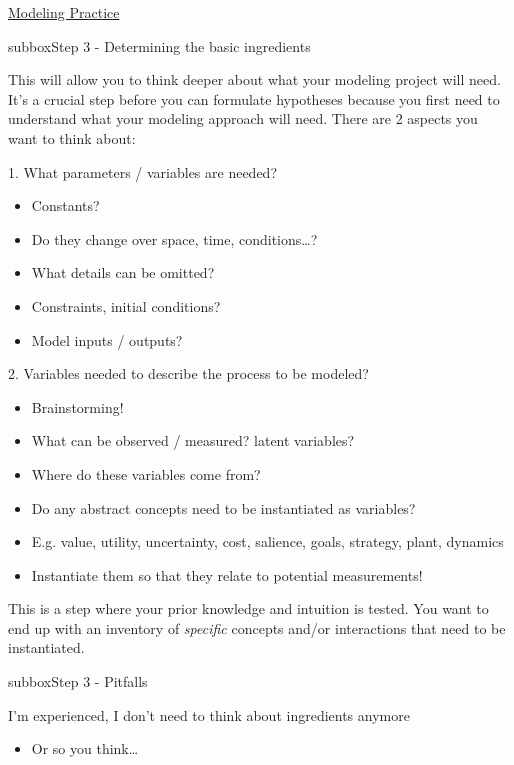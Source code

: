 \begin{textbox}{\href{https://compneuro.neuromatch.io/projects/modelingsteps/ModelingSteps_5through10.html}{Modeling Practice } }

\begin{subbox}{subbox}{Step 3 - Determining the basic ingredients }
\scriptsize

This will allow you to think deeper about what your modeling project will need. It's a crucial step before you can formulate hypotheses because you first need to understand what your modeling approach will need. There are 2 aspects you want to think about:



1.   What parameters / variables are needed? 
\begin{itemize}
    \item 
     Constants?
      \item Do they change over space, time, conditions…?
     \item What details can be omitted?
      \item Constraints, initial conditions?
      \item Model inputs / outputs?
      \end{itemize}  
2.   Variables needed to describe the process to be modeled?
\begin{itemize}
     \item Brainstorming!
     \item What can be observed / measured?  latent variables?    
     \item Where do these variables come from?
     \item Do any abstract concepts need to be instantiated as variables?
       \item E.g. value, utility, uncertainty, cost, salience, goals, strategy, plant, dynamics
        \item Instantiate them so that they relate to potential measurements!
\end{itemize}  
This is a step where your prior knowledge and intuition is tested. You want to end up with an inventory of \textit{specific} concepts and/or interactions that need to be instantiated. 

  \end{subbox}
\begin{subbox}{subbox}{Step 3 - Pitfalls }
\scriptsize


I’m experienced, I don’t need to think about ingredients anymore
 \begin{itemize}
    \item Or so you think… \end{itemize} 


\end{subbox}
\end{textbox}
